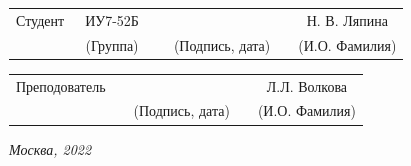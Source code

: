 \noindent
{}
\\

\noindent
{}
\\

\vspace{1.5cm}
\noindent
\begin{tabular}{l c c c c c}
    Студент      & ~ИУ7-52Б~               & \hspace{3.5cm} & \hspace{3.5cm}                 & &  Н. В. Ляпина \\\cline{2-2}\cline{4-4} \cline{6-6}
    \hspace{3cm} & {\footnotesize(Группа)} &                & {\footnotesize(Подпись, дата)} & & {\footnotesize(И.О. Фамилия)}
\end{tabular}

\vspace{1cm}

\noindent
\begin{tabular}{l c c c c}
    Преподователь & \hspace{6cm}   & \hspace{3.5cm}                 & & Л.Л. Волкова \\\cline{3-3} \cline{5-5} 
    \hspace{3cm}  &                & {\footnotesize(Подпись, дата)} & & {\footnotesize(И.О. Фамилия)}
\end{tabular}

\begin{center}	
	\vfill
	\large \textit {Москва, 2022}
\end{center}

\thispagestyle {empty}
\pagebreak